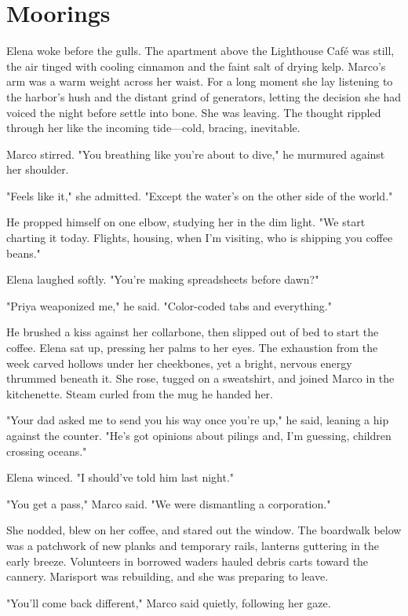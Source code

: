 \chapter{Moorings}

Elena woke before the gulls. The apartment above the Lighthouse Café was still, the air tinged with cooling cinnamon and the faint salt of drying kelp. Marco's arm was a warm weight across her waist. For a long moment she lay listening to the harbor's hush and the distant grind of generators, letting the decision she had voiced the night before settle into bone. She was leaving. The thought rippled through her like the incoming tide—cold, bracing, inevitable.

Marco stirred. "You breathing like you're about to dive," he murmured against her shoulder.

"Feels like it," she admitted. "Except the water's on the other side of the world."

He propped himself on one elbow, studying her in the dim light. "We start charting it today. Flights, housing, when I'm visiting, who is shipping you coffee beans."

Elena laughed softly. "You're making spreadsheets before dawn?"

"Priya weaponized me," he said. "Color-coded tabs and everything."

He brushed a kiss against her collarbone, then slipped out of bed to start the coffee. Elena sat up, pressing her palms to her eyes. The exhaustion from the week carved hollows under her cheekbones, yet a bright, nervous energy thrummed beneath it. She rose, tugged on a sweatshirt, and joined Marco in the kitchenette. Steam curled from the mug he handed her.

"Your dad asked me to send you his way once you're up," he said, leaning a hip against the counter. "He's got opinions about pilings and, I'm guessing, children crossing oceans."

Elena winced. "I should've told him last night."

"You get a pass," Marco said. "We were dismantling a corporation."

She nodded, blew on her coffee, and stared out the window. The boardwalk below was a patchwork of new planks and temporary rails, lanterns guttering in the early breeze. Volunteers in borrowed waders hauled debris carts toward the cannery. Marisport was rebuilding, and she was preparing to leave.

"You'll come back different," Marco said quietly, following her gaze.

